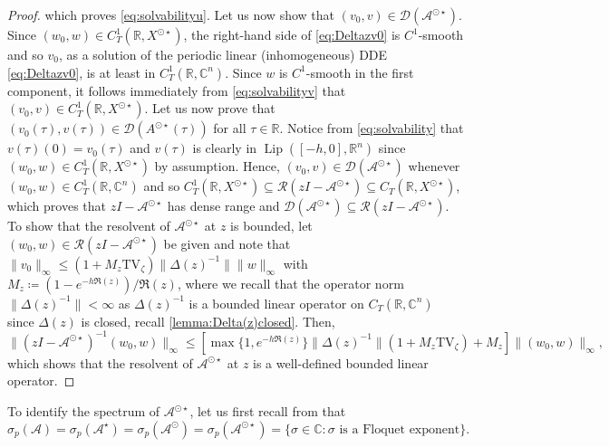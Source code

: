 \documentclass[english]{myarticle}
\DeclareMathOperator{\Lip}{Lip}
\begin{document}
\begin{sloppypar}
\begin{proposition}
\begin{proof}
which proves \eqref{eq:solvabilityu}. Let us now show that $(v_0,v) \in \mathcal{D}(\mathcal{A}^{\odot \star})$. Since $(w_0,w) \in C_T^1(\mathbb{R},X^{\odot \star})$, the right-hand side of \eqref{eq:Deltazv0} is $C^1$-smooth and so $v_0$, as a solution of the periodic linear (inhomogeneous) DDE \eqref{eq:Deltazv0}, is at least in $C_T^1(\mathbb{R},\mathbb{C}^n)$. Since $w$ is $C^1$-smooth in the first component, it follows immediately from \eqref{eq:solvabilityv} that $(v_0,v) \in C_T^1(\mathbb{R},X^{\odot \star})$. Let us now prove that $(v_0(\tau),v(\tau)) \in \mathcal{D}(A^{\odot \star}(\tau))$ for all $\tau \in \mathbb{R}$. Notice from \eqref{eq:solvability} that $v(\tau)(0) = v_0(\tau)$ and $v(\tau)$ is clearly in $\Lip([-h,0],\mathbb{R}^n)$ since $(w_0,w) \in C_T^1(\mathbb{R},X^{\odot \star})$ by assumption. Hence, $(v_0,v) \in \mathcal{D}(\mathcal{A}^{\odot \star})$ whenever $(w_0,w) \in C_T^1(\mathbb{R},\mathbb{C}^n)$ and so $C_T^1(\mathbb{R},X^{\odot \star}) \subseteq \mathcal{R}(zI - \mathcal{A}^{\odot \star}) \subseteq C_T(\mathbb{R},X^{\odot \star})$, which proves that $zI - \mathcal{A}^{\odot \star}$ has dense range and $\mathcal{D}(\mathcal{A}^{\odot \star}) \subseteq \mathcal{R}(zI - \mathcal{A}^{\odot \star})$. To show that the resolvent of $ \mathcal{A}^{\odot \star}$ at $z$ is bounded, let $(w_0,w) \in \mathcal{R}(zI-\mathcal{A}^{\odot \star})$ be given and note that $\| v_0 \|_\infty \leq ( {1+ M_z \mbox{TV}_\zeta } ) \| \Delta(z)^{-1} \|  \| w \|_\infty$ with $M_z \coloneqq (1-e^{-h \Re(z)})/\Re(z)$, where we recall that the operator norm $\| \Delta(z)^{-1} \| < \infty$ as $\Delta(z)^{-1}$ is a bounded linear operator on $C_T(\mathbb{R},\mathbb{C}^n)$ since $\Delta(z)$ is closed, recall \cref{lemma:Delta(z)closed}. Then,
\begin{equation*}
    \| (zI-\mathcal{A}^{\odot \star})^{-1} (w_0,w) \|_\infty \leq [\max\{1,e^{-h \Re(z)} \} \| \Delta(z)^{-1} \| ( {1+ M_z \mbox{TV}_\zeta }) + M_z ] \| (w_0,w) \|_\infty,
\end{equation*}
which shows that the resolvent of $\mathcal{A}^{\odot \star}$ at $z$ is a well-defined bounded linear operator.
\end{proof}
\end{proposition}

To identify the spectrum of $\mathcal{A}^{\odot \star}$, let us first recall from \cite[Proposition 21]{Article1} that
\begin{equation} \label{eq:pointspectracurly}
    \sigma_p(\mathcal{A}) = \sigma_p(\mathcal{A}^\star) = \sigma_p(\mathcal{A}^\odot) = \sigma_p(\mathcal{A}^{\odot \star}) =\{ \sigma \in \mathbb{C} : \sigma \mbox{ is a Floquet exponent} \}.
\end{equation}


\end{sloppypar}
\end{document}
